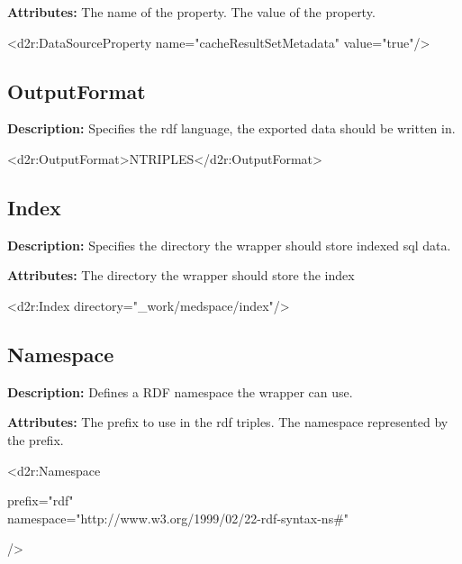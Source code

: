 \textbf{Attributes:} \newline
{}
The name of the property.
\EndAttribute
{}
The value of the property.
\EndAttribute

\begin{ExampleBox}
	<d2r:DataSourceProperty name="cacheResultSetMetadata" value="true"/>
\end{ExampleBox}


\subsection{OutputFormat}
\textbf{Description:} \newline
Specifies the rdf language, the exported data should be written in. 

\begin{ExampleBox}
	<d2r:OutputFormat>NTRIPLES</d2r:OutputFormat>
\end{ExampleBox}

\subsection{Index}
\textbf{Description:} \newline
Specifies the directory the wrapper should store indexed sql data.

\textbf{Attributes:} \newline
{}
The directory the wrapper should store the index
\EndAttribute

\begin{ExampleBox}
	<d2r:Index directory="\_work/medspace/index"/>
\end{ExampleBox}


\subsection{Namespace}
\textbf{Description:} \newline
Defines a RDF namespace the wrapper can use.

\textbf{Attributes:} \newline
{}
The prefix to use in the rdf triples.
\EndAttribute
{}
The namespace represented by the prefix.
\EndAttribute

\begin{ExampleBox}
	<d2r:Namespace 
	\begin{indention}{1cm}
		prefix="rdf"\\
		namespace="http://www.w3.org/1999/02/22-rdf-syntax-ns\#"
	\end{indention}
	/>
\end{ExampleBox}

